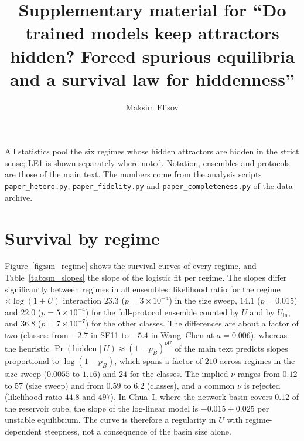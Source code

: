 \documentclass[aip,cha,preprint,amsmath,amssymb,longbibliography]{revtex4-2}
\newcommand{\Uin}{U_{\mathrm{in}}}
\begin{document}
\title{Supplementary material for ``Do trained models keep attractors hidden? Forced spurious equilibria and a survival law
for hiddenness''}
\author{Maksim Elisov}
\maketitle

All statistics pool the six regimes whose hidden attractors are hidden in the strict sense; LE1 is shown separately where
noted. Notation, ensembles and protocols are those of the main text. The numbers come from the analysis scripts
\texttt{paper\_hetero.py}, \texttt{paper\_fidelity.py} and \texttt{paper\_completeness.py} of the data archive.

\section{Survival by regime}

Figure~\ref{fig:sm_regime} shows the survival curves of every regime, and Table~\ref{tab:sm_slopes} the slope of the
logistic fit per regime. The slopes differ significantly between regimes in all ensembles: likelihood ratio for the
regime~$\times\log(1+U)$ interaction $23.3$ ($p=3\times10^{-4}$) in the size sweep, $14.1$ ($p=0.015$) and $22.0$
($p=5\times10^{-4}$) for the full-protocol ensemble counted by $U$ and by $\Uin$, and $36.8$ ($p=7\times10^{-7}$) for the
other classes. The differences are about a factor of two (classes: from $-2.7$ in SE11 to $-5.4$ in Wang--Chen at
$a=0.006$), whereas the heuristic $\Pr(\text{hidden}\mid U)\approx(1-p_B)^{\nu U}$ of the main text predicts slopes
proportional to $\log(1-p_B)$, which spans a factor of $210$ across regimes in the size sweep ($0.0055$ to $1.16$) and $24$ for
the classes. The implied $\nu$ ranges from $0.12$ to $57$ (size sweep) and from $0.59$ to $6.2$ (classes), and a common $\nu$
is rejected (likelihood ratio $44.8$ and $497$). In Chua~I, where the network basin covers $0.12$ of the reservoir cube, the
slope of the log-linear model is $-0.015\pm0.025$ per unstable equilibrium. The curve is therefore a regularity in $U$ with
regime-dependent steepness, not a consequence of the basin size alone.
\end{document}
